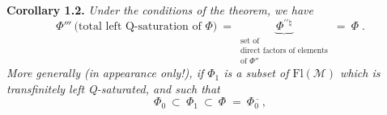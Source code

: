 \documentclass[11pt]{article}
\newcommand{\tld}{\tilde{}}   %
\begin{document}
\bigskip

\textbf{Corollary 1.2.} \textit{Under the conditions of the theorem, we have}
\[
\Phi''' \ \text{(total left Q-saturation of $\Phi$)} \ = \
\underbrace{\Phi^{\prime\prime\natural}}_{\substack{\text{set of}\\ \text{direct factors of elements}\\ \text{of $\Phi''$}}}
\ = \ \Phi^{\tld}\ .
\tag*{(1.2.1)}
\]
\textit{More generally (in appearance only!), if $\Phi_1$ is a subset of \textup{$\mathrm{Fl}(\mathcal{M})$} which is transfinitely left \textup{Q}-saturated, and such that}
\[
\Phi_0 \ \subset \ \Phi_1 \ \subset \ \Phi^{\tld} \ = \ \Phi_0{}^{\tld}\ ,
\]
\end{document}
